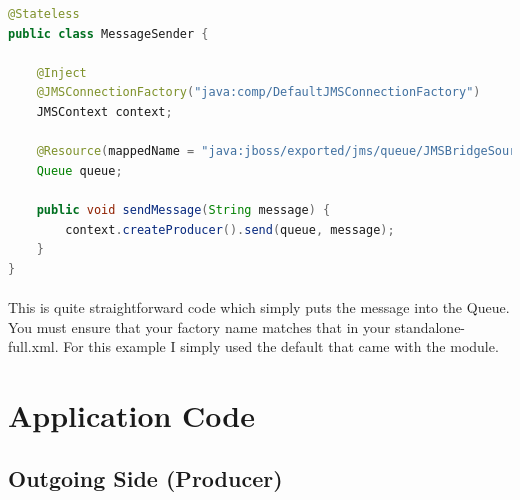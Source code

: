 \documentclass[
10pt, %
letterpaper, %
oneside, %
headinclude,footinclude, %
BCOR5mm, %
]{scrartcl}
\begin{document}
\begin{lstlisting}[language=Java]
@Stateless
public class MessageSender {

    @Inject
    @JMSConnectionFactory("java:comp/DefaultJMSConnectionFactory")
    JMSContext context;

    @Resource(mappedName = "java:jboss/exported/jms/queue/JMSBridgeSourceQ")
    Queue queue;

    public void sendMessage(String message) {
        context.createProducer().send(queue, message);
    }
}
\end{lstlisting}

\paragraph{}
This is quite straightforward code which simply puts the message into the Queue. You must ensure that your factory name matches that in your standalone-full.xml. For this example I simply used the default that came with the module.



\section{Application Code}


\subsection{\textbf{Outgoing Side (Producer)}}
\end{document}
